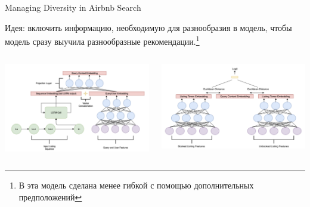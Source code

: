 \documentclass[11pt,aspectratio=169,handout]{beamer}
\begin{document}
\begin{frame}{Managing Diversity in Airbnb Search \cite{AIRBNB}}

Идея: включить информацию, необходимую для разнообразия в модель, чтобы модель сразу выучила разнообразные рекомендации.\footnote{В \cite{AIRBNB2} эта модель сделана менее гибкой с помощью дополнительных предположений}

\begin{columns}

\begin{column}{0.45\textwidth}
\begin{center}
\includegraphics[scale=0.2]{images/airbnb2.png}
\end{center}
\end{column}

\begin{column}{0.45\textwidth} 
\begin{center}
\includegraphics[scale=0.2]{images/airbnb.png}
\end{center}
\end{column}


\end{columns}
\end{frame}
\end{document}
